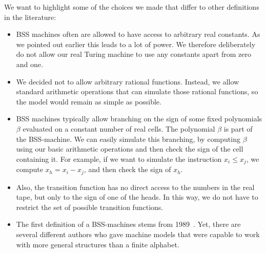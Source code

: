 \documentclass{article}
\begin{document}
We want to highlight some of the choices we made that differ to other definitions in the literature:
\begin{itemize}
    \item BSS machines often are allowed to have access to arbitrary real constants. 
    As we pointed out earlier this leads to a lot of power.
    We therefore deliberately do not allow our real Turing machine to use any constants apart from zero and one.
    \item We decided not to allow arbitrary rational functions.
        Instead, we allow standard arithmetic operations that
        can simulate those rational functions, so the model would remain as simple as possible.
    \item BSS machines typically allow branching on the sign of some fixed polynomials $\beta$ 
    evaluated on a constant number of real cells.
    The polynomial $\beta$ is part of the BSS-machine.
    We can easily simulate this branching, by computing $\beta$ using our basic arithmetic operations and then check the sign 
    of the cell containing it.
    For example, if we want to simulate the instruction $x_i \leq x_j$, we compute $x_h = x_i - x_j$,
    and then check the sign of $x_h$.
    \item Also, the transition function has no direct access to the numbers in the real tape, but only to the sign
        of one of the heads. 
        In this way, we do not have to restrict the set of possible transition functions.
    \item The first definition of a BSS-machines stems from 1989~\cite{BSS89}.
        Yet, there are several different authors who gave machine models 
        that were capable to work with more general structures than a finite alphabet.
        

\end{itemize}
\end{document}
